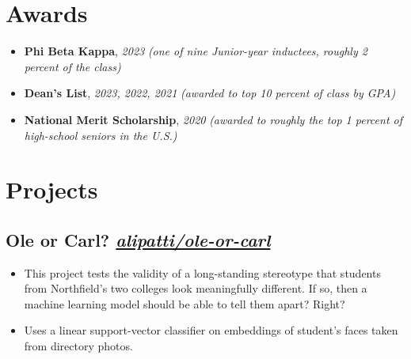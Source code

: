 \documentclass{resume}
\begin{document}





\section{Awards}

\newcommand{\award}[2]{\textbf{#1}, \textit{#2}}

\begin{itemize}[label={}, leftmargin=0em]
	\item \award{Phi Beta Kappa}{2023}
	      \quad \textit{(one of nine Junior-year inductees, roughly 2 percent of the class)}
	\item \award{Dean's List}{2023, 2022, 2021}
	      \quad \textit{(awarded to top 10 percent of class by GPA)}
	\item \award{National Merit Scholarship}{2020}
	      \quad \textit{(awarded to roughly the top 1 percent of high-school seniors in the U.S.)}
\end{itemize}

\section{Projects}

\newcommand{\project}[2]{%
	\subsection{#1
		\hfill
		\normalfont \small \faicon{github}
		\href{http://github.com/alipatti/#2}{\textit{alipatti/#2}}
	}}

\project{Ole or Carl?}{ole-or-carl}

\begin{itemize}
	\item This project tests the validity of a long-standing stereotype that students from Northfield's two colleges look meaningfully different. If so, then a machine learning model should be able to tell them apart? Right?
	\item Uses a linear support-vector classifier on embeddings of student's faces taken from directory photos.
\end{itemize}
\end{document}
